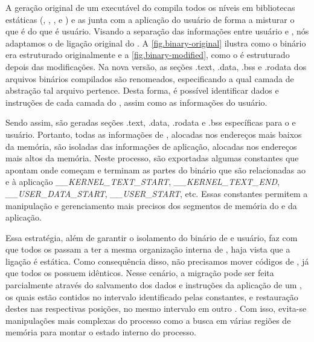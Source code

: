    A geração original de um executável do \nanvix compila todos os níveis em bibliotecas estáticas (\hal, \microkernel, \libnanvix, \ulibc e \multikernel) e as junta com a aplicação do usuário de forma a misturar o que é  do que é usuário.
    Visando a separação das informações entre usuário e , nós adaptamos o \script de ligação original do \nanvix. A \autoref{fig.binary-original} ilustra como o binário era estruturado originalmente e a \autoref{fig.binary-modified}, como o é estruturado depois das modificações. Na nova versão, as seções .text, .data, .bss e .rodata dos arquivos binários compilados são renomeados, especificando a qual camada de abstração tal arquivo pertence. Desta forma, é possível identificar dados e instruções de cada camada do \nanvix, assim como as informações do usuário. 
    
    Sendo assim, são geradas seções .text, .data, .rodata e .bss específicas para o  e usuário. Portanto, todas as informações de , alocadas nos endereços mais baixos da memória, são isoladas das informações de aplicação, alocadas nos endereços mais altos da memória. Neste processo, são exportadas algumas constantes que apontam onde começam e terminam as partes do binário que são relacionadas ao  e à aplicação \eg \textit{\_\_KERNEL\_TEXT\_START}, \textit{\_\_KERNEL\_TEXT\_END}, \textit{\_\_USER\_DATA\_START}, \textit{\_\_USER\_START}, etc. Essas constantes permitem a manipulação e gerenciamento mais precisos dos segmentos de memória do  e da aplicação.
    
    Essa estratégia, além de garantir o isolamento do binário de  e usuário, faz com que todos os \clusters passam a ter a mesma organização interna de , haja vista que a ligação é estática. Como consequência disso, não precisamos mover códigos de , já que todos os \clusters possuem  idênticos. Nesse cenário, a migração pode ser feita parcialmente através do salvamento dos dados e instruções da aplicação de um \cluster, os quais estão contidos no intervalo identificado pelas constantes, e restauração destes nas respectivas posições, \ie no mesmo intervalo em outro \cluster. Com isso, evita-se manipulações mais complexas do processo como a busca em várias regiões de memória para montar o estado interno do processo.


